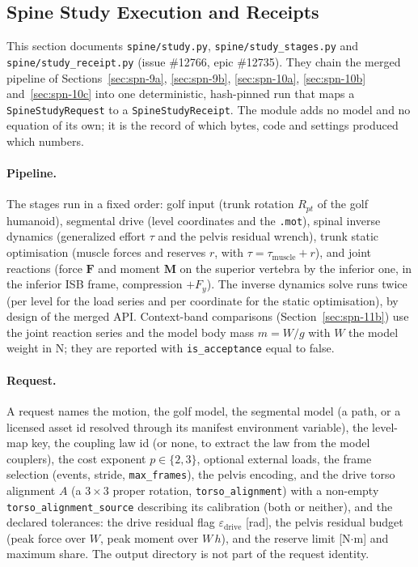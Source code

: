 \subsection{Spine Study Execution and Receipts}
\label{sec:spn-13a}

This section documents \texttt{spine/study.py}, \texttt{spine/study\_stages.py}
and \texttt{spine/study\_receipt.py} (issue \#12766, epic \#12735). They chain
the merged pipeline of Sections~\ref{sec:spn-9a}, \ref{sec:spn-9b},
\ref{sec:spn-10a}, \ref{sec:spn-10b} and~\ref{sec:spn-10c} into one
deterministic, hash-pinned run that maps a \texttt{SpineStudyRequest} to a
\texttt{SpineStudyReceipt}. The module adds no model and no equation of its
own; it is the record of which bytes, code and settings produced which numbers.

\paragraph{Pipeline.}
The stages run in a fixed order: golf input (trunk rotation $R_{pt}$ of the
golf humanoid), segmental drive (level coordinates and the \texttt{.mot}),
spinal inverse dynamics (generalized effort $\tau$ and the pelvis residual
wrench), trunk static optimisation (muscle forces and reserves $r$, with
$\tau = \tau_{\mathrm{muscle}} + r$), and joint reactions (force $\mathbf F$
and moment $\mathbf M$ on the superior vertebra by the inferior one, in the
inferior ISB frame, compression $+F_y$). The inverse dynamics solve runs twice
(per level for the load series and per coordinate for the static
optimisation), by design of the merged API. Context-band comparisons
(Section~\ref{sec:spn-11b}) use the joint reaction series and the model body
mass $m = W/g$ with $W$ the model weight in N; they are reported with
\texttt{is\_acceptance} equal to false.

\paragraph{Request.}
A request names the motion, the golf model, the segmental model (a path, or a
licensed asset id resolved through its manifest environment variable), the
level-map key, the coupling law id (or none, to extract the law from the model
couplers), the cost exponent $p\in\{2,3\}$, optional external loads, the frame
selection (events, stride, \texttt{max\_frames}), the pelvis encoding, and the
drive torso alignment $A$ (a $3\times3$ proper rotation, \texttt{torso\_alignment})
with a non-empty \texttt{torso\_alignment\_source} describing its calibration
(both or neither), and the declared tolerances: the drive residual flag $\varepsilon_{\mathrm{drive}}$
[rad], the pelvis residual budget (peak force over $W$, peak moment over
$W\,h$), and the reserve limit [N$\cdot$m] and maximum share. The output
directory is not part of the request identity.

